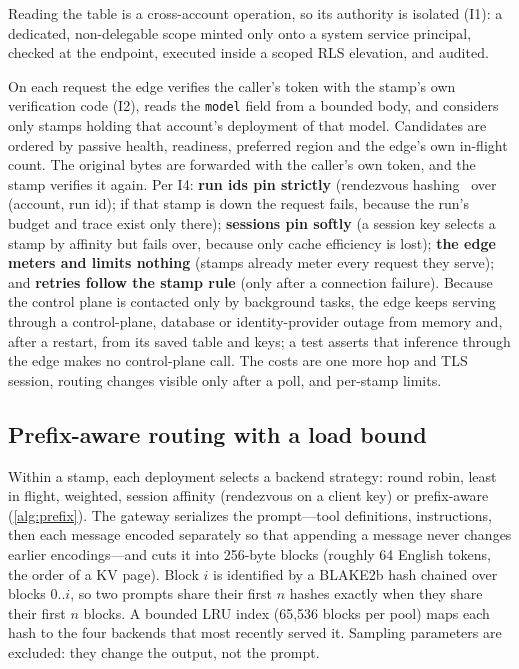 \documentclass[conference,letterpaper]{IEEEtran}
\newcommand{\code}[1]{\texttt{\small #1}}
\begin{document}
Reading the table is a cross-account operation, so its authority is isolated (I1): a
dedicated, non-delegable scope minted only onto a system service principal, checked at the
endpoint, executed inside a scoped RLS elevation, and audited.

On each request the edge verifies the caller's token with the stamp's own verification code
(I2), reads the \code{model} field from a bounded body, and considers only stamps holding that
account's deployment of that model. Candidates are ordered by passive health, readiness,
preferred region and the edge's own in-flight count. The original bytes are forwarded with
the caller's own token, and the stamp verifies it again. Per I4: \textbf{run ids pin
strictly} (rendezvous hashing~\cite{rendezvous} over (account, run id); if that stamp is down
the request fails, because the run's budget and trace exist only there); \textbf{sessions pin
softly} (a session key selects a stamp by affinity but fails over, because only cache
efficiency is lost); \textbf{the edge meters and limits nothing} (stamps already meter every
request they serve); and \textbf{retries follow the stamp rule} (only after a connection
failure). Because the control plane is contacted only by background tasks, the edge keeps
serving through a control-plane, database or identity-provider outage from memory and, after
a restart, from its saved table and keys; a test asserts that inference through the edge makes
no control-plane call. The costs are one more hop and TLS session, routing changes visible
only after a poll, and per-stamp limits.

\subsection{Prefix-aware routing with a load bound}
\label{sec:prefix}
Within a stamp, each deployment selects a backend strategy: round robin, least in flight,
weighted, session affinity (rendezvous on a client key) or prefix-aware (\cref{alg:prefix}).
The gateway serializes the prompt---tool definitions, instructions, then each message encoded
separately so that appending a message never changes earlier encodings---and cuts it into
256-byte blocks (roughly 64 English tokens, the order of a KV page). Block $i$ is identified by
a BLAKE2b hash chained over blocks $0..i$, so two prompts share their first $n$ hashes exactly
when they share their first $n$ blocks. A bounded LRU index (65{,}536 blocks per pool) maps
each hash to the four backends that most recently served it. Sampling parameters are
excluded: they change the output, not the prompt.
\end{document}
